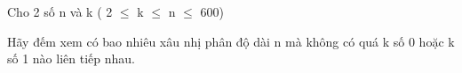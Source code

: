 Cho 2 số n và k ( 2 $\le$ k  $\le$  n  $\le$  600)  

   Hãy đếm xem có bao nhiêu xâu nhị phân độ dài n mà không có quá k số 0 hoặc k số 1 nào liên tiếp nhau.